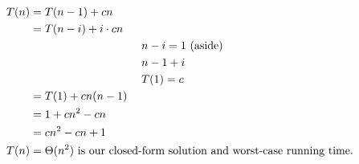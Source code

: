 \documentclass[12pt]{article}
\begin{document}
\begin{equation*}
\begin{split}
    T(n) &= T(n-1) + cn \\
        &= T(n-i) + i \cdot cn\\
    & \hspace{35mm} n - i = 1 \text{ (aside)}\\
    & \hspace{35mm} n - 1 + i \\
    & \hspace{35mm} T(1) = c \\
        &= T(1) + cn(n-1)\\
        &= 1 + cn^{2} - cn\\
        &= cn^{2} - cn + 1\\
    T(n) &= \Theta{(n^2)} \text{ is our closed-form solution and worst-case running time.}
\end{split}
\end{equation*}
\end{document}

